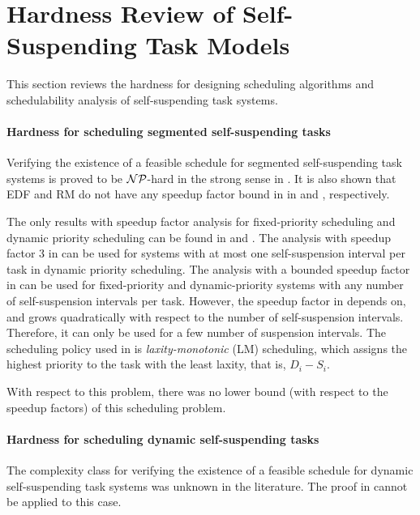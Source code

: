 \section{Hardness Review of Self-Suspending Task Models}
This section reviews the hardness for designing scheduling algorithms and schedulability analysis of self-suspending task systems. 

\paragraph{Hardness for scheduling segmented self-suspending tasks}
Verifying the existence of a feasible schedule for segmented self-suspending task systems is proved to be ${\cal NP}$-hard in the strong sense in \cite{Ridouard_2004}. It is also shown that EDF and RM do not have any speedup factor bound in in \cite{Ridouard_2004} and \cite{RTSS-ChenL14}, respectively. 

The only results with speedup factor analysis for fixed-priority scheduling and dynamic priority scheduling can be found in \cite{RTSS-ChenL14} and \cite{WC16-suspend-DATE}. The analysis with speedup factor $3$ in \cite{RTSS-ChenL14} can be used for systems with at most one self-suspension interval per task in dynamic priority scheduling. The analysis with a bounded speedup factor in \cite{WC16-suspend-DATE} can be used for fixed-priority and dynamic-priority systems with any number of self-suspension intervals per task. However, the speedup factor in \cite{WC16-suspend-DATE} depends on, and grows quadratically with respect to the number of self-suspension intervals. Therefore, it can only be used for a few number of suspension intervals. The scheduling policy used in \cite{WC16-suspend-DATE} is \emph{laxity-monotonic} (LM) scheduling, which assigns the highest priority to the task with the least laxity, that is, $D_i-S_i$.


With respect to this problem, there was no lower bound (with respect to the speedup factors) of this scheduling problem. 

\paragraph{Hardness for scheduling dynamic self-suspending tasks}
The complexity class for verifying the existence of a feasible schedule for dynamic self-suspending task systems was unknown in the literature. The proof in \cite{Ridouard_2004} cannot be applied to this case. 

